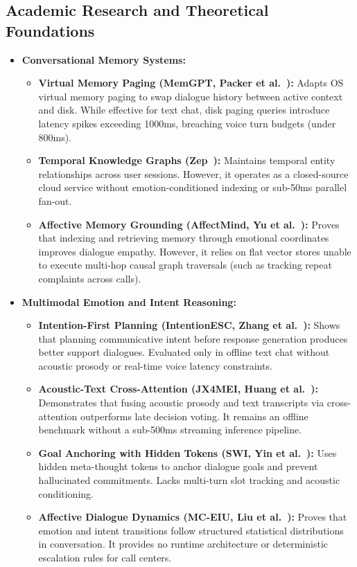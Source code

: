 \documentclass[12pt,a4paper]{article}
\begin{document}
\subsection{Academic Research and Theoretical Foundations}

\begin{itemize}[leftmargin=*]
    \item \textbf{Conversational Memory Systems:}
    \begin{itemize}[leftmargin=1.5em]
        \item \textbf{Virtual Memory Paging (MemGPT, Packer et al.~\cite{memgpt}):} Adapts OS virtual memory paging to swap dialogue history between active context and disk. While effective for text chat, disk paging queries introduce latency spikes exceeding 1000ms, breaching voice turn budgets (under 800ms).
        \item \textbf{Temporal Knowledge Graphs (Zep~\cite{zep}):} Maintains temporal entity relationships across user sessions. However, it operates as a closed-source cloud service without emotion-conditioned indexing or sub-50ms parallel fan-out.
        \item \textbf{Affective Memory Grounding (AffectMind, Yu et al.~\cite{affectmind}):} Proves that indexing and retrieving memory through emotional coordinates improves dialogue empathy. However, it relies on flat vector stores unable to execute multi-hop causal graph traversals (such as tracking repeat complaints across calls).
    \end{itemize}

    \item \textbf{Multimodal Emotion and Intent Reasoning:}
    \begin{itemize}[leftmargin=1.5em]
        \item \textbf{Intention-First Planning (IntentionESC, Zhang et al.~\cite{intentionesc}):} Shows that planning communicative intent before response generation produces better support dialogues. Evaluated only in offline text chat without acoustic prosody or real-time voice latency constraints.
        \item \textbf{Acoustic-Text Cross-Attention (JX4MEI, Huang et al.~\cite{jx4mei}):} Demonstrates that fusing acoustic prosody and text transcripts via cross-attention outperforms late decision voting. It remains an offline benchmark without a sub-500ms streaming inference pipeline.
        \item \textbf{Goal Anchoring with Hidden Tokens (SWI, Yin et al.~\cite{swi}):} Uses hidden meta-thought tokens to anchor dialogue goals and prevent hallucinated commitments. Lacks multi-turn slot tracking and acoustic conditioning.
        \item \textbf{Affective Dialogue Dynamics (MC-EIU, Liu et al.~\cite{mceiu}):} Proves that emotion and intent transitions follow structured statistical distributions in conversation. It provides no runtime architecture or deterministic escalation rules for call centers.
    \end{itemize}
\end{itemize}
\end{document}
